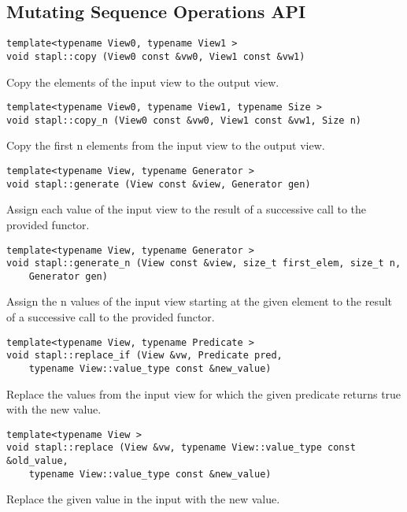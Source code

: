 \subsection{Mutating Sequence Operations API} \label{sec-mutate-alg}

\begin{verbatim}
template<typename View0, typename View1 >
void stapl::copy (View0 const &vw0, View1 const &vw1)
\end{verbatim}

Copy the elements of the input view to the output view.

\begin{verbatim}
template<typename View0, typename View1, typename Size >
void stapl::copy_n (View0 const &vw0, View1 const &vw1, Size n)
\end{verbatim}

Copy the first n elements from the input view to the output view.

\begin{verbatim}
template<typename View, typename Generator >
void stapl::generate (View const &view, Generator gen)
\end{verbatim}

Assign each value of the input view to the result of a successive call to the provided functor.

\begin{verbatim}
template<typename View, typename Generator >
void stapl::generate_n (View const &view, size_t first_elem, size_t n,
    Generator gen)
\end{verbatim}


Assign the n values of the input view starting at the given element to the result of a successive call to the provided functor.

\begin{verbatim}
template<typename View, typename Predicate >
void stapl::replace_if (View &vw, Predicate pred,
    typename View::value_type const &new_value)
\end{verbatim}

Replace the values from the input view for which the given predicate returns true with the new value.

\begin{verbatim}
template<typename View >
void stapl::replace (View &vw, typename View::value_type const &old_value,
    typename View::value_type const &new_value)
\end{verbatim}

Replace the given value in the input with the new value.

